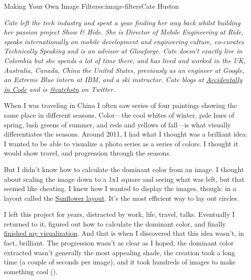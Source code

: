 \begin{aosachapter}{Making Your Own Image Filters}{s:image-filters}{Cate Huston}

\emph{Cate left the tech industry and spent a year finding her way back
whilst building her passion project Show \& Hide. She is Director of
Mobile Engineering at Ride, speaks internationally on mobile development
and engineering culture, co-curates Technically Speaking and is an
advisor at Glowforge. Cate doesn't exactly live in Colombia but she
spends a lot of time there, and has lived and worked in the UK,
Australia, Canada, China the United States, previously as an engineer at
Google, an Extreme Blue intern at IBM, and a ski instructor. Cate blogs
at \href{http://www.catehuston.com/blog/}{Accidentally in Code} and is
\href{https://twitter.com/catehstn}{@catehstn} on Twitter.}

\label{a-brilliant-idea-that-wasnt-all-that-brilliant}

When I was traveling in China I often saw series of four paintings
showing the same place in different seasons. Color---the cool whites of
winter, pale hues of spring, lush greens of summer, and reds and yellows
of fall---is what visually differentiates the seasons. Around 2011, I
had what I thought was a brilliant idea: I wanted to be able to
visualize a photo series as a series of colors. I thought it would show
travel, and progression through the seasons.

But I didn't know how to calculate the dominant color from an image. I
thought about scaling the image down to a 1x1 square and seeing what was
left, but that seemed like cheating. I knew how I wanted to display the
images, though: in a layout called the
\href{http://www.catehuston.com/applets/Sunflower/index.html}{Sunflower
layout}. It's the most efficient way to lay out circles.

I left this project for years, distracted by work, life, travel, talks.
Eventually I returned to it, figured out how to calculate the dominant
color, and finally
\href{http://www.catehuston.com/blog/2013/09/02/visualising-a-photo-series/}{finished
my visualization}. And that is when I discovered that this idea wasn't,
in fact, brilliant. The progression wasn't as clear as I hoped, the
dominant color extracted wasn't generally the most appealing shade, the
creation took a long time (a couple of seconds per image), and it took
hundreds of images to make something cool
().


\end{aosachapter}
